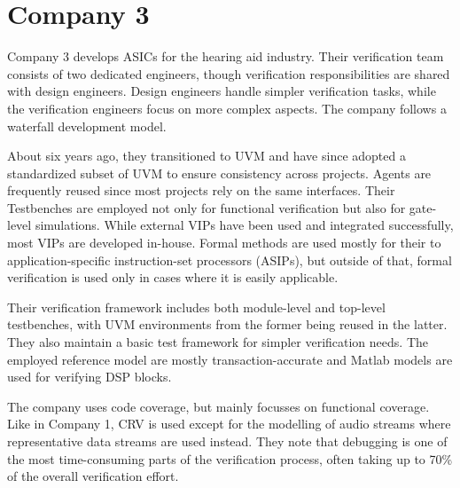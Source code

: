 \documentclass[11pt,a4paper]{report}
\begin{document}

\section{Company 3} %

Company 3 develops ASICs for the hearing aid industry. Their verification team consists of two dedicated engineers,
though verification responsibilities are shared with design engineers. Design engineers handle simpler verification
tasks, while the verification engineers focus on more complex aspects. The company follows a waterfall development model.

About six years ago, they transitioned to UVM and have since adopted a standardized subset of UVM to ensure
consistency across projects. Agents are frequently reused since most projects rely on the same interfaces. Their
Testbenches are employed not only for functional verification but also for gate-level simulations. While external
VIPs have been used and integrated successfully, most VIPs are developed in-house. Formal methods are used mostly for
their to application-specific instruction-set processors (ASIPs), but outside of that, formal verification is used
only in cases where it is easily applicable.

Their verification framework includes both module-level and top-level testbenches, with UVM environments from the
former being reused in the latter. They also maintain a basic test framework for simpler verification needs. The
employed reference model are mostly transaction-accurate and Matlab models are used for verifying DSP blocks.

The company uses code coverage, but mainly focusses on functional coverage. Like in Company 1, CRV is used except for
the modelling of audio streams where representative data streams are used instead. They note that debugging is one of
the most time-consuming parts of the verification process, often taking up to 70\% of the overall verification effort.
\end{document}
